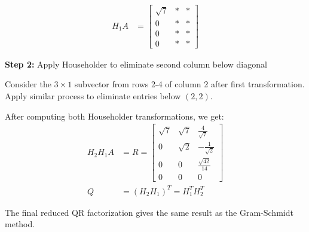 \begin{align*}
    H_1 A & = \begin{bmatrix}
                  \sqrt{7} & * & * \\
                  0        & * & * \\
                  0        & * & * \\
                  0        & * & *
              \end{bmatrix}
\end{align*}

\textbf{Step 2:} Apply Householder to eliminate second column below diagonal

Consider the $3 \times 1$ subvector from rows 2-4 of column 2 after first transformation. Apply similar process to eliminate entries below $(2,2)$.

After computing both Householder transformations, we get:
\begin{align*}
    H_2 H_1 A & = R = \begin{bmatrix}
                          \sqrt{7} & \sqrt{7} & \frac{4}{\sqrt{7}}   \\
                          0        & \sqrt{2} & -\frac{1}{\sqrt{2}}  \\
                          0        & 0        & \frac{\sqrt{42}}{14} \\
                          0        & 0        & 0
                      \end{bmatrix} \\
    Q         & = (H_2 H_1)^T = H_1^T H_2^T
\end{align*}

The final reduced QR factorization gives the same result as the Gram-Schmidt method.

